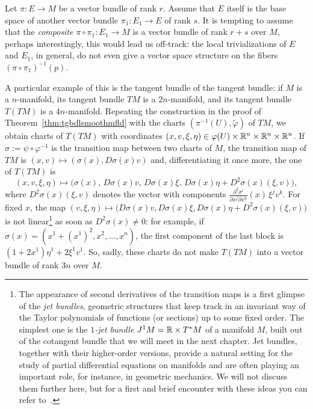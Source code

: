 \begin{remark}
	Let $\pi:E \to M$ be a vector bundle of rank $r$.
	Assume that $E$ itself is the base space of another vector bundle $\pi_1: E_1\to E$ of rank $s$.
	It is tempting to assume that the \emph{composite} $\pi\circ\pi_1: E_1 \to M$ is a vector bundle of rank $r+s$ over $M$, perhaps interestingly, this would lead us off-track: the local trivializations of $E$ and $E_1$, in general, do not even give a vector space structure on the fibers $(\pi\circ\pi_1)^{-1}(p)$.

	A particular example of this is the tangent bundle of the tangent bundle: if $M$ is a $n$-manifold, its tangent bundle $TM$ is a $2n$-manifold, and its tangent bundle $T(TM)$ is a $4n$-manifold.
	Repeating the construction in the proof of Theorem~\ref{thm:tgbdlsmoothmfld} with the charts $(\pi^{-1}(U),\widetilde\varphi)$ of $TM$, we obtain charts of $T(TM)$ with coordinates $(x,v,\xi,\eta)\in\varphi(U)\times\mathbb{R}^n\times\mathbb{R}^n\times\mathbb{R}^n$.
	If $\sigma := \psi\circ\varphi^{-1}$ is the transition map between two charts of $M$, the transition map of $TM$ is $(x,v)\mapsto(\sigma(x), D\sigma(x)v)$ and, differentiating it once more, the one of $T(TM)$ is
	\begin{equation}
		(x,v,\xi,\eta)\mapsto \big(\sigma(x),\, D\sigma(x)v,\, D\sigma(x)\xi,\, D\sigma(x)\eta + D^2\sigma(x)(\xi,v)\big),
	\end{equation}
	where $D^2\sigma(x)(\xi,v)$ denotes the vector with components $\frac{\partial^2\sigma^i}{\partial x^j\partial x^k}(x)\,\xi^j v^k$.
	For fixed $x$, the map $(v,\xi,\eta)\mapsto\big(D\sigma(x)v, D\sigma(x)\xi, D\sigma(x)\eta + D^2\sigma(x)(\xi,v)\big)$ is not linear\footnote{The appearance of second derivatives of the transition maps is a first glimpse of the \emph{jet bundles}, geometric structures that keep track in an invariant way of the Taylor polynomials of functions (or sections) up to some fixed order.
	The simplest one is the \emph{$1$-jet bundle} $J^1M = \mathbb{R}\times T^*M$ of a manifold $M$, built out of the cotangent bundle that we will meet in the next chapter.
	Jet bundles, together with their higher-order versions, provide a natural setting for the study of partial differential equations on manifolds and are often playing an important role, for instance, in geometric mechanics. We will not discuss them further here, but for a first and brief encounter with these ideas you can refer to~\cite[Chapter 22]{book:lee}.} as soon as $D^2\sigma(x)\neq0$: for example, if $\sigma(x) = (x^1+(x^1)^2, x^2, \ldots, x^n)$, the first component of the last block is $(1+2x^1)\eta^1 + 2\xi^1v^1$.
	So, sadly, these charts do not make $T(TM)$ into a vector bundle of rank $3n$ over $M$.


\end{remark}
